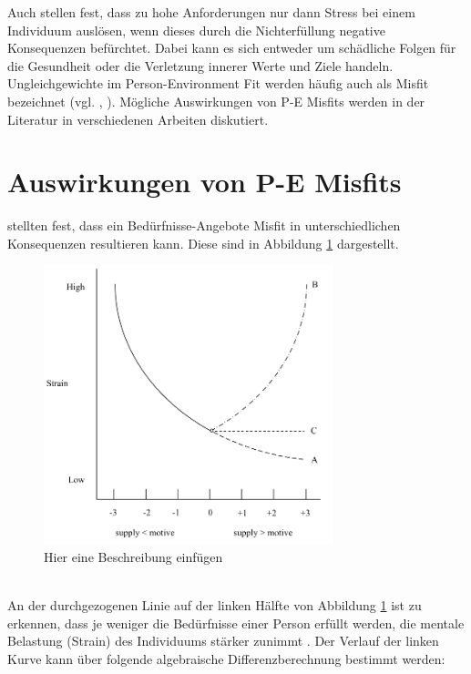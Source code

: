 Auch \textcite[S. 1ff.]{lazarus:1978} stellen fest, dass zu hohe Anforderungen nur dann Stress bei einem Individuum auslösen, wenn dieses durch die Nichterfüllung negative Konsequenzen befürchtet. Dabei kann es sich entweder um schädliche Folgen für die Gesundheit oder die Verletzung innerer Werte und Ziele handeln.\\
Ungleichgewichte im Person-Environment Fit werden häufig auch als Misfit bezeichnet (vgl. \cite[S. 2]{edwards:2004}, \cite[S. 4]{kristof:1996}). Mögliche Auswirkungen von P-E Misfits werden in der Literatur in verschiedenen Arbeiten diskutiert.

\section{Auswirkungen von P-E Misfits}
\label{ch:personEnvironmentFit:auswirkungenErhoehterAngebote}
\textcite{mechanismsOfJobStressAndStrain:1982} stellten fest, dass ein Bedürfnisse-Angebote Misfit in unterschiedlichen Konsequenzen resultieren kann. Diese sind in Abbildung \ref{fig:personEnvironmentFit:auswirkungenErhoehterAngebote:abb1} dargestellt.\\
\begin{figure}[h]
	\centering
	\includegraphics[width=0.75\textwidth]{gfx/ueberschuss_supply_motive.png}
	\caption{Hier eine Beschreibung einfügen \cite[S. 23]{edwards:2008}}
	\label{fig:personEnvironmentFit:auswirkungenErhoehterAngebote:abb1}
\end{figure}\\
An der durchgezogenen Linie auf der linken Hälfte von Abbildung \ref{fig:personEnvironmentFit:auswirkungenErhoehterAngebote:abb1} ist zu erkennen, dass je weniger die Bedürfnisse einer Person erfüllt werden, die mentale Belastung (Strain) des Individuums stärker zunimmt \cite{mechanismsOfJobStressAndStrain:1982}. Der Verlauf der linken Kurve kann über folgende algebraische Differenzberechnung bestimmt werden:
